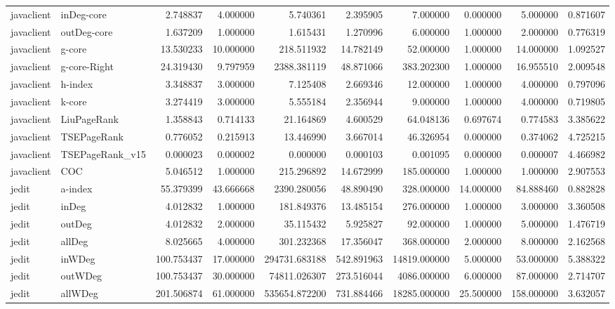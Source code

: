 \begin{tabular}{llrrrrrrrr}
javaclient & inDeg-core & 2.748837 & 4.000000 & 5.740361 & 2.395905 & 7.000000 & 0.000000 & 5.000000 & 0.871607 \\
javaclient & outDeg-core & 1.637209 & 1.000000 & 1.615431 & 1.270996 & 6.000000 & 1.000000 & 2.000000 & 0.776319 \\
javaclient & g-core & 13.530233 & 10.000000 & 218.511932 & 14.782149 & 52.000000 & 1.000000 & 14.000000 & 1.092527 \\
javaclient & g-core-Right & 24.319430 & 9.797959 & 2388.381119 & 48.871066 & 383.202300 & 1.000000 & 16.955510 & 2.009548 \\
javaclient & h-index & 3.348837 & 3.000000 & 7.125408 & 2.669346 & 12.000000 & 1.000000 & 4.000000 & 0.797096 \\
javaclient & k-core & 3.274419 & 3.000000 & 5.555184 & 2.356944 & 9.000000 & 1.000000 & 4.000000 & 0.719805 \\
javaclient & LiuPageRank & 1.358843 & 0.714133 & 21.164869 & 4.600529 & 64.048136 & 0.697674 & 0.774583 & 3.385622 \\
javaclient & TSEPageRank & 0.776052 & 0.215913 & 13.446990 & 3.667014 & 46.326954 & 0.000000 & 0.374062 & 4.725215 \\
javaclient & TSEPageRank_v15 & 0.000023 & 0.000002 & 0.000000 & 0.000103 & 0.001095 & 0.000000 & 0.000007 & 4.466982 \\
javaclient & COC & 5.046512 & 1.000000 & 215.296892 & 14.672999 & 185.000000 & 1.000000 & 1.000000 & 2.907553 \\
jedit & a-index & 55.379399 & 43.666668 & 2390.280056 & 48.890490 & 328.000000 & 14.000000 & 84.888460 & 0.882828 \\
jedit & inDeg & 4.012832 & 1.000000 & 181.849376 & 13.485154 & 276.000000 & 1.000000 & 3.000000 & 3.360508 \\
jedit & outDeg & 4.012832 & 2.000000 & 35.115432 & 5.925827 & 92.000000 & 1.000000 & 5.000000 & 1.476719 \\
jedit & allDeg & 8.025665 & 4.000000 & 301.232368 & 17.356047 & 368.000000 & 2.000000 & 8.000000 & 2.162568 \\
jedit & inWDeg & 100.753437 & 17.000000 & 294731.683188 & 542.891963 & 14819.000000 & 5.000000 & 53.000000 & 5.388322 \\
jedit & outWDeg & 100.753437 & 30.000000 & 74811.026307 & 273.516044 & 4086.000000 & 6.000000 & 87.000000 & 2.714707 \\
jedit & allWDeg & 201.506874 & 61.000000 & 535654.872200 & 731.884466 & 18285.000000 & 25.500000 & 158.000000 & 3.632057 \\

\end{tabular}
